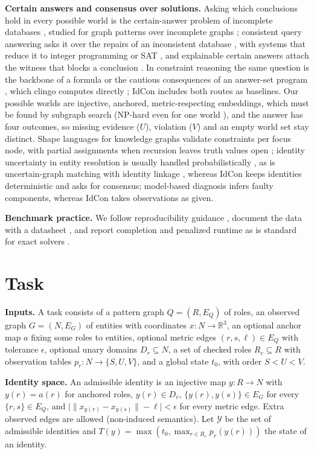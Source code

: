 \textbf{Certain answers and consensus over solutions.} Asking which conclusions hold in every possible world is the certain-answer problem of incomplete databases \cite{imielinski,libkin2011,libkin2014}, studied for graph patterns over incomplete graphs \cite{barcelo}; consistent query answering asks it over the repairs of an inconsistent database \cite{arenas}, with systems that reduce it to integer programming \cite{equip} or SAT \cite{cavsat}, and explainable certain answers attach the witness that blocks a conclusion \cite{certain_answers}. In constraint reasoning the same question is the backbone of a formula \cite{backbones,cadiback} or the cautious consequences of an answer-set program \cite{cautious}, which clingo computes directly \cite{clingo}; IdCon includes both routes as baselines. Our possible worlds are injective, anchored, metric-respecting embeddings, which must be found by subgraph search (NP-hard even for one world \cite{karp,marx}), and the answer has four outcomes, so missing evidence ($U$), violation ($V$) and an empty world set stay distinct. Shape languages for knowledge graphs validate constraints per focus node, with partial assignments when recursion leaves truth values open \cite{shacl}; identity uncertainty in entity resolution is usually handled probabilistically \cite{pasula}, as is uncertain-graph matching with identity linkage \cite{moustafa}, whereas IdCon keeps identities deterministic and asks for consensus; model-based diagnosis \cite{reiter} infers faulty components, whereas IdCon takes observations as given.

\textbf{Benchmark practice.} We follow reproducibility guidance \cite{peng,gundersen,pineau}, document the data with a datasheet \cite{datasheets}, and report completion and penalized runtime as is standard for exact solvers \cite{mccreesh_hard}.

\section{Task}
\label{sec:task}
\textbf{Inputs.} A task consists of a pattern graph $Q=(R,E_Q)$ of roles, an observed graph $G=(N,E_G)$ of entities with coordinates $x:N\to\mathbb{R}^3$, an optional anchor map $a$ fixing some roles to entities, optional metric edges $(r,s,\ell)\in E_Q$ with tolerance $\epsilon$, optional unary domains $D_r\subseteq N$, a set of checked roles $R_c\subseteq R$ with observation tables $p_r:N\to\{S,U,V\}$, and a global state $t_0$, with order $S<U<V$.

\textbf{Identity space.} An admissible identity is an injective map $y:R\to N$ with $y(r)=a(r)$ for anchored roles, $y(r)\in D_r$, $\{y(r),y(s)\}\in E_G$ for every $\{r,s\}\in E_Q$, and $\bigl|\|x_{y(r)}-x_{y(s)}\|-\ell\bigr|<\epsilon$ for every metric edge. Extra observed edges are allowed (non-induced semantics). Let $\mathcal{Y}$ be the set of admissible identities and $T(y)=\max(t_0,\max_{r\in R_c}p_r(y(r)))$ the state of an identity.

